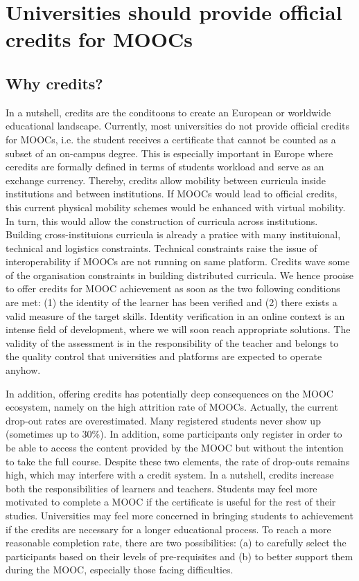 \section{Universities should provide official credits for MOOCs}
\label{sec:credit}
 
\subsection{Why credits?}

In a nutshell, credits are the conditoons to create an European or
worldwide educational landscape. 
Currently, most universities do not provide official credits for MOOCs,
i.e. the student receives a certificate that cannot be counted as a
subset of an on-campus degree. This is especially important in Europe where
ceredits are formally defined in terms of students workload and serve as
an exchange currency. Thereby, credits allow mobility between curricula inside
institutions and between institutions. If MOOCs would lead to official
credits, this current physical mobility schemes would be enhanced with 
virtual mobility. In turn, this would allow the construction of curricula
across institutions. Building cross-instituions curricula is already a
pratice with many instituional, technical and logistics constraints. 
Technical constraints raise the issue of interoperability if MOOCs are not
running on same platform. Credits wave some of the organisation constraints
in building distributed curricula. We hence prooise to offer  credits for 
MOOC achievement as soon as the two following conditions are met: (1) the identity of the
learner has been verified and (2) there exists a valid
measure of the target skills. Identity verification in an online context
is an intense field of development, where we will soon reach appropriate
solutions. The validity of the assessment is in the responsibility of
the teacher and belongs to the quality control that universities and
platforms are expected to operate anyhow.

In addition, offering credits has potentially deep consequences on the MOOC
ecosystem, namely on the high attrition rate of MOOCs. Actually, the
current drop-out rates are overestimated. Many registered students never
show up (sometimes up to 30\%). In addition, some participants only
register in order to be able to access the content provided by the MOOC
but without the intention to take the full course. Despite these two
elements, the rate of drop-outs remains high, which may interfere with a
credit system. In a nutshell, credits increase both the responsibilities
of learners and teachers. Students may feel more motivated to complete a
MOOC if the certificate is useful for the rest of their
studies. Universities may feel more concerned in bringing students to
achievement if the credits are necessary for a longer educational
process.  To reach a more reasonable completion rate, there are two
possibilities: (a) to carefully select the participants based on their
levels of pre-requisites and (b) to better support them during the MOOC,
especially those facing difficulties.


